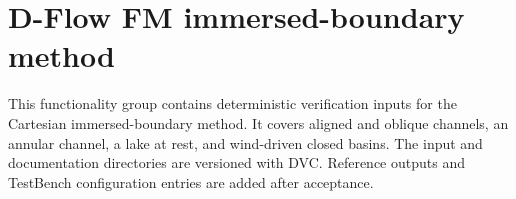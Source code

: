 \documentclass{article}
\begin{document}
\section{D-Flow FM immersed-boundary method}
This functionality group contains deterministic verification inputs for the Cartesian immersed-boundary method. It covers aligned and oblique channels, an annular channel, a lake at rest, and wind-driven closed basins. The input and documentation directories are versioned with DVC. Reference outputs and TestBench configuration entries are added after acceptance.

\end{document}
